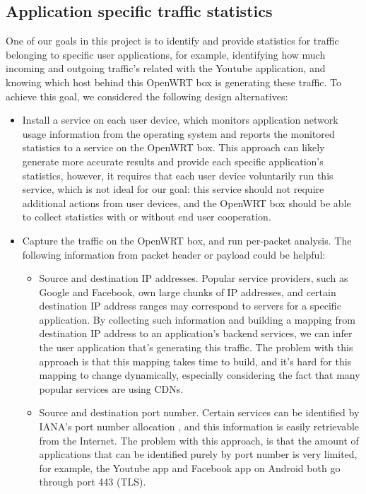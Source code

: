 \subsection{Application specific traffic statistics}

One of our goals in this project is to identify and provide statistics for traffic belonging to specific user applications, for example, identifying how much incoming and outgoing traffic's related with the Youtube application, and knowing which host behind this OpenWRT box is generating these traffic. To achieve this goal, we considered the following design alternatives:

\begin{itemize}

\item Install a service on each user device, which monitors application network usage information from the operating system and reports the monitored statistics to a service on the OpenWRT box. This approach can likely generate more accurate results and provide each specific application's statistics, however, it requires that each user device voluntarily run this service, which is not ideal for our goal: this service should not require additional actions from user devices, and the OpenWRT box should be able to collect statistics with or without end user cooperation.

\item Capture the traffic on the OpenWRT box, and run per-packet analysis. The following information from packet header or payload could be helpful:

  \begin{itemize}

  \item Source and destination IP addresses. Popular service providers, such as Google and Facebook, own large chunks of IP addresses, and certain destination IP address ranges may correspond to servers for a specific application. By collecting such information and building a  mapping from destination IP address to an application's backend services, we can infer the user application that's generating this traffic. The problem with this approach is that this mapping takes time to build, and it's hard for this mapping to change dynamically, especially considering the fact that many popular services are using CDNs.

  \item Source and destination port number. Certain services can be identified by IANA's port number allocation \cite{PortAssignment}, and this information is easily retrievable from the Internet. The problem with this approach, is that the amount of applications that can be identified purely by port number is very limited, for example, the Youtube app and Facebook app on Android both go through port 443 (TLS).


\end{itemize}
\end{itemize}
